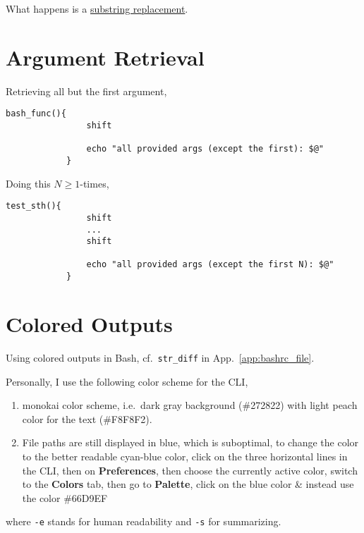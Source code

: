 \documentclass[12pt, a4paper]{scrbook}
\numberwithin{equation}{section}
\theoremstyle{definition}
\theoremstyle{definition}
\begin{document}
	What happens is a \href{https://stackoverflow.com/questions/13210880/replace-one-substring-for-another-string-in-shell-script}{\color{blue}substring replacement}. 
	
	\section{Argument Retrieval}
	
		Retrieving all but the first argument, 
		
		\begin{lstlisting}[style=mystylebash, label=alg:bash__args_shift, xleftmargin=\parindent]
			bash_func(){
				shift
				
				echo "all provided args (except the first): $@"
			}
		\end{lstlisting}
		
		Doing this $N\geq 1$-times,
		
		\begin{lstlisting}[style=mystylebash, label=alg:bash__args_shift_gen, xleftmargin=\parindent]
			test_sth(){
				shift
				...
				shift
				
				echo "all provided args (except the first N): $@"
			}
		\end{lstlisting}
	
		\section{Colored Outputs}
		
		Using colored outputs in Bash, cf.~\texttt{str\_diff} in App.~\ref{app:bashrc_file}. 
		
		Personally, I use the following color scheme for the CLI,
		
		\begin{enumerate}
			\item monokai color scheme, i.e.~dark gray background (\#272822) with light peach color for the text (\#F8F8F2).
			\item File paths are still displayed in blue, which is suboptimal, to change the color to the better readable cyan-blue color, click on the three horizontal 
			lines in the CLI, then on \textbf{Preferences}, then choose the currently active color, switch to the \textbf{Colors} tab, then go to \textbf{Palette}, 
			click on the blue color \& instead use the color \#66D9EF
		\end{enumerate}
		
		where \texttt{-e} stands for human readability and \texttt{-s} for summarizing. 
\end{document}

